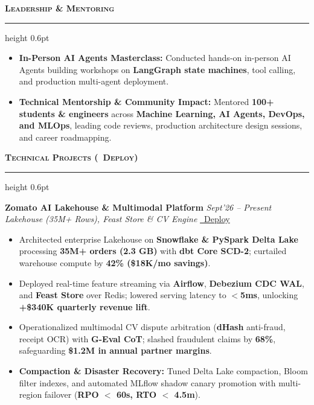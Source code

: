 \documentclass[10pt,a4paper]{article}
\newcommand{\resumesection}[1]{%
    \vspace{2.2pt}%
    {\color{burgundy}\scshape\bfseries\fontsize{9.0pt}{10.2pt}\selectfont #1}%
    \vspace{0.6pt}%
    \hrule height 0.6pt\relax%
    \vspace{1.6pt}%
}
\begin{document}
\begin{minipage}[t]{0.488\textwidth}
    \resumesection{Leadership \& Mentoring}
    \begin{itemize}
        \item \textbf{In-Person AI Agents Masterclass:} Conducted hands-on in-person AI Agents building workshops on \textbf{LangGraph state machines}, tool calling, and production multi-agent deployment.
        \item \textbf{Technical Mentorship \& Community Impact:} Mentored \textbf{100+ students \& engineers} across \textbf{Machine Learning, AI Agents, DevOps, and MLOps}, leading code reviews, production architecture design sessions, and career roadmapping.
    \end{itemize}

\end{minipage}%
\hfill
\begin{minipage}[t]{0.488\textwidth}

    \resumesection{Technical Projects \textnormal{\scriptsize(\faRocket\ Deploy)}}

    \noindent\textbf{Zomato AI Lakehouse \& Multimodal Platform} \hfill {\footnotesize\textit{Sept'26 -- Present}}\\
    \textit{Lakehouse (35M+ Rows), Feast Store \& CV Engine} \href{https://github.com/KishorKumarParoi/zomato-analysis}{\faGithub} \href{https://raw.githubusercontent.com/KishorKumarParoi/zomato-analysis/main/bootstrap.sh}{\faRocket\ Deploy}
    \begin{itemize}
        \item Architected enterprise Lakehouse on \textbf{Snowflake \& PySpark Delta Lake} processing \textbf{35M+ orders (2.3 GB)} with \textbf{dbt Core SCD-2}; curtailed warehouse compute by \textbf{42\% (\$18K/mo savings)}.
        \item Deployed real-time feature streaming via \textbf{Airflow}, \textbf{Debezium CDC WAL}, and \textbf{Feast Store} over Redis; lowered serving latency to \textbf{$<$5ms}, unlocking \textbf{+\$340K quarterly revenue lift}.
        \item Operationalized multimodal CV dispute arbitration (\textbf{dHash} anti-fraud, receipt OCR) with \textbf{G-Eval CoT}; slashed fraudulent claims by \textbf{68\%}, safeguarding \textbf{\$1.2M in annual partner margins}.
        \item \textbf{Compaction \& Disaster Recovery:} Tuned Delta Lake compaction, Bloom filter indexes, and automated MLflow shadow canary promotion with multi-region failover (\textbf{RPO $<$ 60s, RTO $<$ 4.5m}).
    \end{itemize}


\end{minipage}
\end{document}
